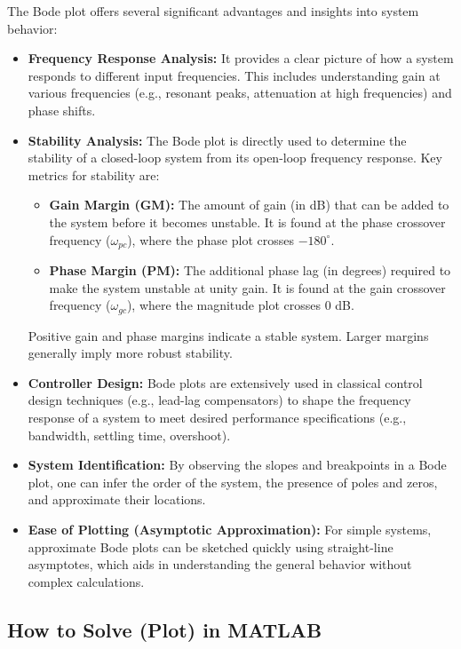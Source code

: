 \documentclass[a4paper,12pt]{article}
\begin{document}
	The Bode plot offers several significant advantages and insights into system behavior:
	\begin{itemize}
		\item \textbf{Frequency Response Analysis:} It provides a clear picture of how a system responds to different input frequencies. This includes understanding gain at various frequencies (e.g., resonant peaks, attenuation at high frequencies) and phase shifts.
		\item \textbf{Stability Analysis:} The Bode plot is directly used to determine the stability of a closed-loop system from its open-loop frequency response. Key metrics for stability are:
		\begin{itemize}
			\item \textbf{Gain Margin (GM):} The amount of gain (in dB) that can be added to the system before it becomes unstable. It is found at the phase crossover frequency ($\omega_{pc}$), where the phase plot crosses $-180^\circ$.
			\item \textbf{Phase Margin (PM):} The additional phase lag (in degrees) required to make the system unstable at unity gain. It is found at the gain crossover frequency ($\omega_{gc}$), where the magnitude plot crosses 0 dB.
		\end{itemize}
		Positive gain and phase margins indicate a stable system. Larger margins generally imply more robust stability.
		\item \textbf{Controller Design:} Bode plots are extensively used in classical control design techniques (e.g., lead-lag compensators) to shape the frequency response of a system to meet desired performance specifications (e.g., bandwidth, settling time, overshoot).
		\item \textbf{System Identification:} By observing the slopes and breakpoints in a Bode plot, one can infer the order of the system, the presence of poles and zeros, and approximate their locations.
		\item \textbf{Ease of Plotting (Asymptotic Approximation):} For simple systems, approximate Bode plots can be sketched quickly using straight-line asymptotes, which aids in understanding the general behavior without complex calculations.
	\end{itemize}
	
	\subsection*{How to Solve (Plot) in MATLAB}
	
\end{document}
